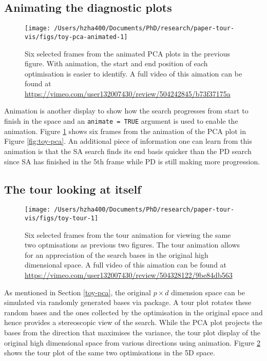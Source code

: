 \hypertarget{animating-the-diagnostic-plots}{%
\subsection{Animating the diagnostic
plots}\label{animating-the-diagnostic-plots}}

\begin{Schunk}
\begin{figure}
\texttt{[image: /Users/hzha400/Documents/PhD/research/paper-tour-vis/figs/toy-pca-animated-1]} \caption{Six selected frames from the animated PCA plots in the previous figure. With animation, the start and end position of each optimisation is easier to identify.  A full video of this aimation can be found at \url{https://vimeo.com/user132007430/review/504242845/b73f37175a}}\label{fig:toy-pca-animated}
\end{figure}
\end{Schunk}

Animation is another display to show how the search progresses from
start to finish in the space and an \texttt{animate\ =\ TRUE} argument
is used to enable the animation. Figure \ref{fig:toy-pca-animated} shows
six frames from the animation of the PCA plot in Figure
\ref{fig:toy-pca}. An additional piece of information one can learn from
this animation is that the SA search finds its end basis quicker than
the PD search since SA has finished in the 5th frame while PD is still
making more progression.

\hypertarget{the-tour-looking-at-itself}{%
\subsection{The tour looking at
itself}\label{the-tour-looking-at-itself}}

\begin{Schunk}
\begin{figure}
\texttt{[image: /Users/hzha400/Documents/PhD/research/paper-tour-vis/figs/toy-tour-1]} \caption{Six selected frames from the tour animation for viewing the same two optmisations as previous two figures. The tour animation allows for an appreciation of the search bases in the original high dimensional space. A full video of this aimation can be found at \url{https://vimeo.com/user132007430/review/504328122/9be84db563}}\label{fig:toy-tour}
\end{figure}
\end{Schunk}

As mentioned in Section \ref{toy-pca}, the original \(p \times d\)
dimension space can be simulated via randomly generated bases via
 \citep{geozoo} package. A tour plot rotates these
random bases and the ones collected by the optimisation in the original
space and hence provides a stereoscopic view of the search. While the
PCA plot projects the bases from the direction that maximises the
variance, the tour plot display of the original high dimensional space
from various directions using animation. Figure \ref{fig:toy-tour} shows
the tour plot of the same two optimisations in the 5D space.

